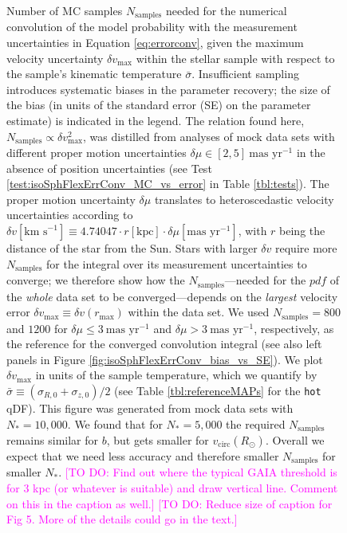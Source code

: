 \documentclass[iop,revtex4]{emulateapj}
\newcommand{\pdf}{\ensuremath{pdf}}
\newcommand{\Wilma}[1]{\textcolor{Magenta}{#1}}
\begin{document}
\begin{figure}[!htbp]
\caption{Number of MC samples $N_\text{samples}$ needed for the numerical convolution of the model probability with the measurement uncertainties in Equation \eqref{eq:errorconv}, given the maximum velocity uncertainty $\delta v_\text{max}$ within the stellar sample with respect to the sample's kinematic temperature $\bar{\sigma}$. Insufficient sampling introduces systematic biases in the parameter recovery; the size of the bias (in units of the standard error (SE) on the parameter estimate) is indicated in the legend. The relation found here, $N_\text{samples} \propto \delta v_\text{max}^2$, was distilled from analyses of mock data sets with different proper motion uncertainties $\delta \mu \in [2,5]~\text{mas yr}^{-1}$ in the absence of position uncertainties (see Test \ref{test:isoSphFlexErrConv_MC_vs_error} in Table \ref{tbl:tests}). The proper motion uncertainty $\delta \mu$ translates to heteroscedastic velocity uncertainties according to $\delta v [\text{km s}^{-1}] \equiv 4.74047 \cdot r[\text{kpc}] \cdot \delta \mu [\text{mas yr}^{-1}]$, with $r$ being the distance of the star from the Sun. Stars with larger $\delta v$ require more $N_\text{samples}$ for the integral over its measurement uncertainties to converge; we therefore show how the $N_\text{samples}$---needed for the \pdf{} of the \emph{whole} data set to be converged---depends on the \emph{largest} velocity error $\delta v_\text{max} \equiv \delta v(r_\text{max})$ within the data set. We used $N_\text{samples} = 800$ and  $1200$ for $\delta \mu \leq 3~\text{mas yr}^{-1}$ and $\delta \mu > 3~\text{mas yr}^{-1}$, respectively, as the reference for the converged convolution integral (see also left panels in Figure \ref{fig:isoSphFlexErrConv_bias_vs_SE}). We plot $\delta v_\text{max}$ in units of the sample temperature, which we quantify by $\bar{\sigma} \equiv (\sigma_{R,0} + \sigma_{z,0})/2$ (see Table \ref{tbl:referenceMAPs} for the \texttt{hot} qDF). This figure was generated from mock data sets with $N_{*}=10,000$. We found that for $N_{*}=5,000$ the required $N_\text{samples}$ remains similar for $b$, but gets smaller for $v_\text{circ}(R_\odot)$. Overall we expect that we need less accuracy and therefore smaller $N_\text{samples}$ for smaller $N_{*}$. \Wilma{[TO DO: Find out where the typical GAIA threshold is for 3 kpc (or whatever is suitable) and draw vertical line. Comment on this in the caption as well.]} \Wilma{[TO DO: Reduce size of caption for Fig 5. More of the details could go in the text.]}}
\label{fig:isoSphFlexErrConv_MC_vs_error}
\end{figure}
\end{document}
